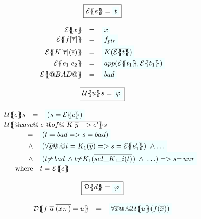 \begin{figure}\small
\setlength{\arraycolsep}{2pt} 
\[\begin{array}{c} 
\ruleform{\etrans{\Sigma}{\Gamma}{e} = \formula{t} } \\ \\
\begin{array}{rcl}
\etrans{\Sigma}{\Gamma}{x} & = & \formula{x} \\
\etrans{\Sigma}{\Gamma}{f[\ol{\tau}]} & = & \formula{f_{ptr}} \\
\etrans{\Sigma}{\Gamma}{K[\ol{\tau}](\ol{e})} & = & \formula{K(\ol{\etrans{e}{\Gamma}{t}})} \\
\etrans{\Sigma}{\Gamma}{e_1\;e_2} & = & \formula{app(\etrans{\Sigma}{\Gamma}{t_1},
                                                     \etrans{\Sigma}{\Gamma}{t_1})} \\
\etrans{\Sigma}{\Gamma}{@BAD@} & = & \formula{\bad}
\end{array}
\\ \\
\ruleform{\utrans{\Sigma}{u}{s} = \formula{\phi}} \\ \\
\begin{array}{rcl}
\utrans{\Sigma}{e}{s}
  & = & \formula{(s = \etrans{\Sigma}{\Gamma}{e})} \\
\multicolumn{3}{l}{\utrans{\Sigma}
    {@case@\;e\;@of@\;\ol{K\;\ol{y} -> e'}}{s}} \\
\multicolumn{3}{l}{
\quad 
  \begin{array}[t]{rl}
    = & \formula{(t = \bad => s = bad)} \\ 
    \land & \formula{(\forall \ol{y} @.@ t = K_1(\ol{y}) => s = \etrans{\Sigma}{\Gamma}{e'_1})\;\land \ldots}  \\
    \land & \formula{(t{\neq}\bad\;\land\;
                 t{\neq}K_1(\oln{{\sel{K_1}{i}}(t)}{})\;\land\;\ldots) => s{=}\unr} \\
    \mbox{where} & t  =  \etrans{\Sigma}{\Gamma}{e} 
 \end{array}
}
\end{array}
\\ \\
\ruleform{\dtrans{\Sigma}{d} = \formula{\phi}} \\ \\
\begin{array}{rcl}
  \dtrans{\Sigma}{f \;\ol{a}\;\ol{(x{:}\tau)} = u} 
    & =     & \formula{\forall \ol{x} @.@ \utrans{\sigma}{u}(f(\ol{x}))} \\

\end{array}
\end{array}\]
\end{figure}
